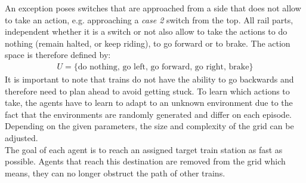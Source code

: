 An exception poses switches that are approached from a side that does not allow to take an action, e.g. approaching a \textit{case 2} switch from the top.
All rail parts, independent whether it is a switch or not also allow to take the actions to do nothing (remain halted, or keep riding), to go forward or to brake.
The action space is therefore defined by:
\begin{gather*}
U = \{ \text{do nothing, go left, go forward, go right, brake} \}
\end{gather*}
It is important to note that trains do not have the ability to go backwards and therefore need to plan ahead to avoid getting stuck. To learn which actions to take, the agents have to learn to adapt to an unknown environment due to the fact that the environments are randomly generated and differ on each episode. Depending on the given parameters, the size and complexity of the grid can be adjusted.\\
The goal of each agent is to reach an assigned target train station as fast as possible. Agents that reach this destination are removed from the grid which means, they can no longer obstruct the path of other trains.

